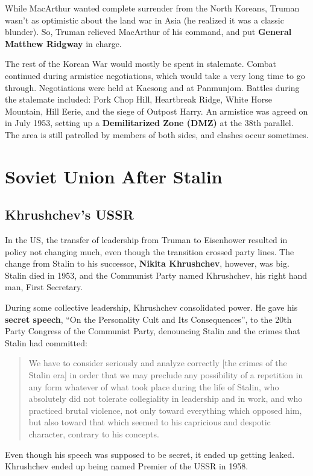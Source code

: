 While MacArthur wanted complete surrender from the North Koreans,
Truman wasn't as optimistic about the land war in Asia (he realized it was a classic blunder).
So, Truman relieved MacArthur of his command, and put \textbf{General Matthew Ridgway} in charge.

The rest of the Korean War would mostly be spent in stalemate.
Combat continued during armistice negotiations, which would take a very long time to go through.
Negotiations were held at Kaesong and at Panmunjom.
Battles during the stalemate included:
Pork Chop Hill,
Heartbreak Ridge,
White Horse Mountain,
Hill Eerie,
and the siege of Outpost Harry.
An armistice was agreed on in July 1953, setting up a \textbf{Demilitarized Zone (DMZ)} at the 38th parallel.
The area is still patrolled by members of both sides, and clashes occur sometimes.

\section{Soviet Union After Stalin}

\subsection*{Khrushchev's USSR}

In the US, the transfer of leadership from Truman to Eisenhower resulted in policy not changing much,
even though the transition crossed party lines.
The change from Stalin to his successor, \textbf{Nikita Khrushchev}, however, was big.
Stalin died in 1953, and the Communist Party named Khrushchev, his right hand man, First Secretary.

During some collective leadership, Khrushchev consolidated power.
He gave his \textbf{secret speech}, ``On the Personality Cult and Its Consequences'',
to the 20th Party Congress of the Communist Party,
denouncing Stalin and the crimes that Stalin had committed:
\begin{quote}
  We have to consider seriously and analyze correctly [the crimes of the Stalin era]
  in order that we may preclude any possibility of a repetition in any form whatever
  of what took place during the life of Stalin,
  who absolutely did not tolerate collegiality in leadership and in work,
  and who practiced brutal violence, not only toward everything which opposed him,
  but also toward that which seemed to his capricious and despotic character, contrary to his concepts.
\end{quote}
Even though his speech was supposed to be secret, it ended up getting leaked.
Khrushchev ended up being named Premier of the USSR in 1958.


